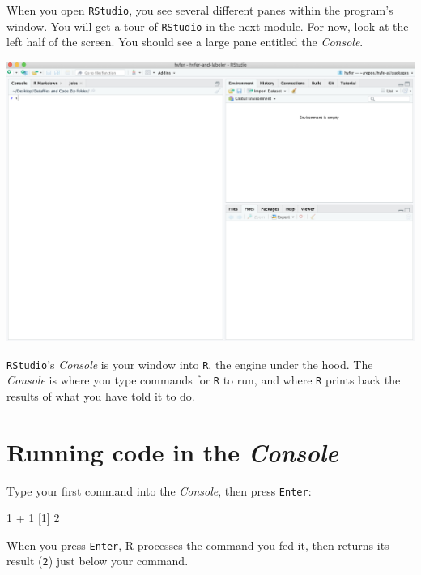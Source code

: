 \documentclass[
]{book}
\newenvironment{Shaded}{\begin{snugshade}}{\end{snugshade}}
\newcommand{\DecValTok}[1]{\textcolor[rgb]{0.00,0.00,0.81}{#1}}
\newcommand{\NormalTok}[1]{#1}
\newcommand{\SpecialCharTok}[1]{\textcolor[rgb]{0.00,0.00,0.00}{#1}}
\begin{document}
When you open \texttt{RStudio}, you see several different panes within the program's window. You will get a tour of \texttt{RStudio} in the next module. For now, look at the left half of the screen. You should see a large pane entitled the \emph{Console}.

\includegraphics{img/rstudio_firstopen.png}

\texttt{RStudio}'s \emph{Console} is your window into \texttt{R}, the engine under the hood. The \emph{Console} is where you type commands for \texttt{R} to run, and where \texttt{R} prints back the results of what you have told it to do.

\hypertarget{running-code-in-the-console}{%
\section*{\texorpdfstring{Running code in the \emph{Console}}{Running code in the Console}}\label{running-code-in-the-console}}

Type your first command into the \emph{Console}, then press \texttt{Enter}:

\begin{Shaded}
\begin{Highlighting}[]
\DecValTok{1} \SpecialCharTok{+} \DecValTok{1}
\NormalTok{[}\DecValTok{1}\NormalTok{] }\DecValTok{2}
\end{Highlighting}
\end{Shaded}

When you press \texttt{Enter}, R processes the command you fed it, then returns its result (\texttt{2}) just below your command.
\end{document}
